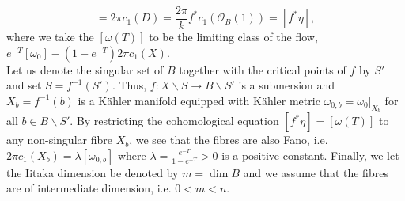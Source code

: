 \documentclass[12pt]{article}
\numberwithin{equation}{section}
\newcommand{\OO}{\mathcal{O}}
\begin{document}
\begin{equation*}
[\omega(T)] = 2\pi c_1(D) = \frac{2\pi}{k} f^*c_1( \OO_B(1)) = [f^*\eta],
\end{equation*}
where we take the $[\omega(T)]$ to be the limiting class of the flow, $e^{-T} [\omega_0] - (1-e^{-T})2\pi c_1(X)$.\\
Let us denote the singular set of $B$ together with the critical points of $f$ by $S'$ and set $S = f^{-1}(S')$. Thus, $f: X \backslash S \to B \backslash S'$ is a submersion and $X_b = f^{-1}(b)$ is a K\"ahler manifold equipped with K\"ahler metric $\omega_{0,b} = \omega_0|_{X_b}$ for all $b \in B \backslash S'$. By restricting the cohomological equation $[f^*\eta] = [\omega(T)]$ to any non-singular fibre $X_b$, we see that the fibres are also Fano, i.e. $2\pi c_1(X_b) = \lambda [\omega_{0,b}]$ where $\lambda =\frac{e^{-T}}{1-e^{-T}} > 0$ is a positive constant. Finally, we let the Iitaka dimension be denoted by $m = \dim B$ and we assume that the fibres are of intermediate dimension, i.e. $0 < m < n$.\\
\end{document}
